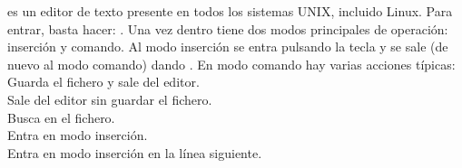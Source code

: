  es un editor de texto presente en todos los sistemas UNIX, incluido Linux. Para entrar, basta hacer: . Una vez dentro tiene dos modos principales de operación: inserción y comando. Al modo inserción se entra pulsando la tecla  y se sale (de nuevo al modo comando) dando . En modo comando hay varias acciones típicas:\\
   Guarda el fichero y sale del editor.\\
   Sale del editor sin guardar el fichero.\\
   Busca en el fichero.\\
   Entra en modo inserción.\\
   Entra en modo inserción en la línea siguiente.

